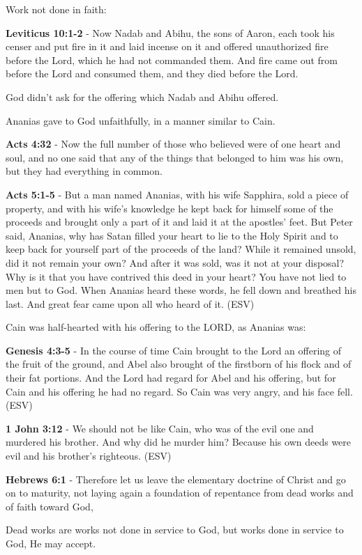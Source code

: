 \documentclass[11pt]{article}
\begin{document}
Work not done in faith:

\textbf{Leviticus 10:1-2} - Now Nadab and Abihu, the sons of Aaron, each took his censer and put fire in it and laid incense on it and offered unauthorized fire before the Lord, which he had not commanded them. And fire came out from before the Lord and consumed them, and they died before the Lord.

God didn't ask for the offering which Nadab and Abihu offered.

Ananias gave to God unfaithfully, in a manner similar to Cain.

\textbf{Acts 4:32} - Now the full number of those who believed were of one heart and soul, and no one said that any of the things that belonged to him was his own, but they had everything in common.

\textbf{Acts 5:1-5} -  But a man named Ananias, with his wife Sapphira, sold a piece of property, and with his wife's knowledge he kept back for himself some of the proceeds and brought only a part of it and laid it at the apostles' feet.  But Peter said, Ananias, why has Satan filled your heart to lie to the Holy Spirit and to keep back for yourself part of the proceeds of the land?  While it remained unsold, did it not remain your own?  And after it was sold, was it not at your disposal?  Why is it that you have contrived this deed in your heart?  You have not lied to men but to God.  When Ananias heard these words, he fell down and breathed his last.  And great fear came upon all who heard of it.  (ESV)

Cain was half-hearted with his offering to the LORD, as Ananias was:

\textbf{Genesis 4:3-5} - In the course of time Cain brought to the Lord an offering of the fruit of the ground, and Abel also brought of the firstborn of his flock and of their fat portions. And the Lord had regard for Abel and his offering, but for Cain and his offering he had no regard. So Cain was very angry, and his face fell. (ESV)

\textbf{1 John 3:12} - We should not be like Cain, who was of the evil one and murdered his brother. And why did he murder him? Because his own deeds were evil and his brother's righteous. (ESV)

\textbf{Hebrews 6:1} - Therefore let us leave the elementary doctrine of Christ and go on to maturity, not laying again a foundation of repentance from dead works and of faith toward God,

Dead works are works not done in service to God, but works done in service to God, He may accept.
\end{document}
